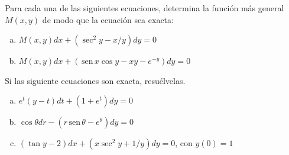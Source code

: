 \documentclass[12pt]{exam}
\renewcommand{\sin}{\,\text{sen}\,}
\begin{document}
\begin{questions}
\begin{enumerate}[a)]
\end{enumerate}

     \question
     Para cada una de las siguientes ecuaciones, determina la función más general $M(x,y)$ de modo que la ecuación sea exacta:
     \begin{enumerate}[a)]
     	\item	$M(x,y)dx+(\sec^2y-x/y)dy=0$
        \item	$M(x,y)dx+(\sin x\cos y-xy-e^{-y})dy=0$
     \end{enumerate}

     \question
      Si las siguiente ecuaciones son exacta, resuélvelas.
      \begin{enumerate}[a)]
      	\item	$e^t(y-t)dt+(1+e^t)dy=0$
        \item	$\cos\theta dr-(r\sin\theta-e^{\theta})dy=0$
        \item	$(\tan y-2)dx+(x\sec^2y+1/y)dy=0$, con $y(0)=1$
      \end{enumerate}





        \end{questions}
        \vskip30pt

\pagestyle{foot}    %
\end{document}

